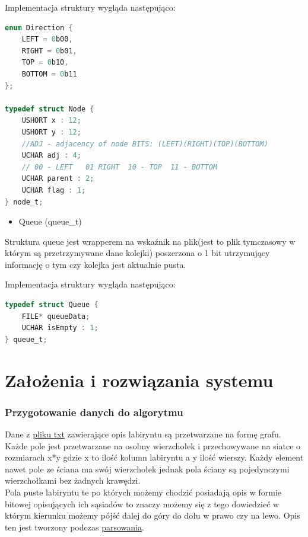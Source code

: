 \documentclass[
]{article}
\begin{document}
Implementacja struktury wygląda następująco:

\begin{lstlisting}[language=C, caption=Struktura Node]
  enum Direction {
    LEFT = 0b00,
    RIGHT = 0b01,
    TOP = 0b10,
    BOTTOM = 0b11
};

typedef struct Node {
    USHORT x : 12;
    USHORT y : 12;
    //ADJ - adjacency of node BITS: (LEFT)(RIGHT)(TOP)(BOTTOM)
    UCHAR adj : 4;
    // 00 - LEFT   01 RIGHT  10 - TOP  11 - BOTTOM
    UCHAR parent : 2;
    UCHAR flag : 1;
} node_t;
\end{lstlisting}

\begin{itemize}
\item
  Queue (queue\_t)
\end{itemize}

Struktura queue jest wrapperem na wskaźnik na plik(jest to plik
tymczasowy w którym są przetrzymywane dane kolejki) poszerzona o 1 bit
utrzymujący informację o tym czy kolejka jest aktualnie pusta.

Implementacja struktury wygląda następująco:

\begin{lstlisting}[language=C, caption=Struktura Queue]
  typedef struct Queue {
    FILE* queueData;
    UCHAR isEmpty : 1;
} queue_t;
\end{lstlisting}

\hypertarget{zaux142oux17cenia-i-rozwiux105zania-systemu}{%
\section{Założenia i rozwiązania
systemu}\label{zaux142oux17cenia-i-rozwiux105zania-systemu}}

\hypertarget{przygotowanie-danych-do-algorytmu}{%
\subsubsection{\texorpdfstring{Przygotowanie danych do algorytmu
}{Przygotowanie danych do algorytmu }}\label{przygotowanie-danych-do-algorytmu}}

Dane z \hyperref[pliki-wejux15bciowe]{pliku txt}  zawierające opis labiryntu są
przetwarzane na formę grafu. Każde pole jest przetwarzane na osobny
wierzchołek i przechowywane na siatce o rozmiarach x*y gdzie x to ilość
kolumn labiryntu a y ilość wierszy. Każdy element nawet pole ze ściana
ma swój wierzchołek jednak pola ściany są pojedynczymi wierzchołkami bez
żadnych krawędzi.\\
Pola puste labiryntu te po których możemy chodzić posiadają opis w
formie bitowej opisujących ich sąsiadów to znaczy możemy się z tego
dowiedzieć w którym kierunku możemy pójść dalej do góry do dołu w prawo
czy na lewo. Opis ten jest tworzony podczas \hyperref[parser]{parsowania}.
\end{document}
